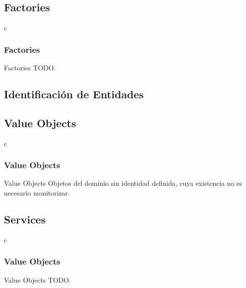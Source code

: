 \documentclass[a4paper,slidestop,xcolor=pst,dvips,blue]{beamer}
\begin{document}
\subsection{Factories}

\begin{frame}{c}
    \frametitle{Factories}
    \begin{block}{Factories}
    TODO.
    \end{block}
\end{frame}

\subsection{Identificación de Entidades}

%
%
\subsection{Value Objects}

\begin{frame}{c}
    \frametitle{Value Objects}
    \begin{block}{Value Objects}
    Objetos del dominio sin identidad definida, cuya existencia no es necesario monitorizar.
    \end{block}
\end{frame}

\subsection{Services}

\begin{frame}{c}
    \frametitle{Value Objects}
    \begin{block}{Value Objects}
    TODO.
    \end{block}
\end{frame}
\end{document}
